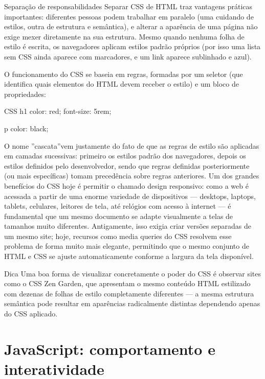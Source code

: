 \begin{infobox}{Separação de responsabilidades}
Separar CSS de HTML traz vantagens práticas importantes: diferentes pessoas podem trabalhar em paralelo (uma cuidando de estilos, outra de estrutura e semântica), e alterar a aparência de uma página não exige mexer diretamente na sua estrutura. Mesmo quando nenhuma folha de estilo é escrita, os navegadores aplicam estilos padrão próprios (por isso uma lista sem CSS ainda aparece com marcadores, e um link aparece sublinhado e azul).
\end{infobox}

O funcionamento do CSS se baseia em regras, formadas por um seletor (que identifica quais elementos do HTML devem receber o estilo) e um bloco de propriedades:

\begin{codebox}{CSS}
h1 {
  color: red;
  font-size: 5rem;
}

p {
  color: black;
}
\end{codebox}

O nome ”cascata”vem justamente do fato de que as regras de estilo são aplicadas em camadas sucessivas: primeiro os estilos padrão dos navegadores, depois os estilos definidos pelo desenvolvedor, sendo que regras definidas posteriormente (ou mais específicas) tomam precedência sobre regras anteriores. Um dos grandes benefícios do CSS hoje é permitir o chamado design responsivo: como a web é acessada a partir de uma enorme variedade de dispositivos — desktops, laptops, tablets, celulares, leitores de tela, até relógios com acesso à internet — é fundamental que um mesmo documento se adapte visualmente a telas de tamanhos muito diferentes. Antigamente, isso exigia criar versões separadas de um mesmo site; hoje, recursos como media queries do CSS resolvem esse problema de forma muito mais elegante, permitindo que o mesmo conjunto de HTML e CSS se ajuste automaticamente conforme a largura da tela disponível.

\begin{infobox}{Dica}
Uma boa forma de visualizar concretamente o poder do CSS é observar sites como o CSS Zen Garden, que apresentam o mesmo conteúdo HTML estilizado com dezenas de folhas de estilo completamente diferentes — a mesma estrutura semântica pode resultar em aparências radicalmente distintas dependendo apenas do CSS aplicado.
\end{infobox}

\section{JavaScript: comportamento e interatividade}

